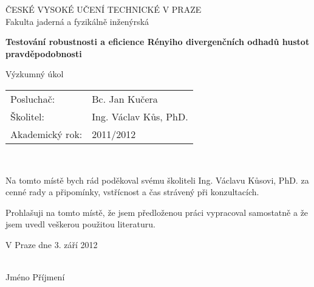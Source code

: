\begin{center}
\hbox{}
\thispagestyle{empty}

{\Large ČESKÉ VYSOKÉ UČENÍ TECHNICKÉ V PRAZE} \\[3mm]
{\Large Fakulta jaderná a fyzikálně inženýrská}

\vspace{80mm}

{\LARGE\bf Testování robustnosti a eficience Rényiho divergenčních odhadů hustot pravděpodobnosti }


{\LARGE Výzkumný úkol}


\end{center}

\begin{tabular}{ll} 
{\Large Posluchač:} & {\Large Bc. Jan Kučera} \\[1mm]
{\Large \v{S}kolitel:} & {\Large Ing. Václav Kůs, PhD.} \\[2mm]
{\Large Akademický rok:}     & {\Large 2011/2012}
\end{tabular}

\newpage 


\thispagestyle{empty}
\normalsize %
\ \vspace{10mm}

\noindent Na tomto místě bych rád poděkoval svému školiteli Ing. Václavu Kůsovi, PhD. za cenné rady a připomínky, vstřícnost a čas strávený při konzultacích. %


\vspace{0.5cm}

Prohlašuji na tomto místě, že jsem předloženou práci
vypracoval samostatně a že jsem uvedl veškerou použitou
literaturu.

\vspace{1.5cm}

\noindent
\begin{minipage}[b]{5cm}
V Praze dne 3. září 2012
\end{minipage}
\hfill
\begin{minipage}[t]{5cm}
\begin{center}
\dotfill\\
Jméno Příjmení
\end{center}
\end{minipage}

\vspace*{2cm}  

\newpage